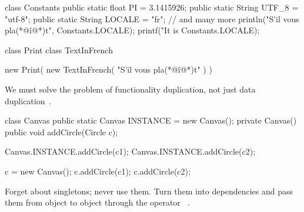 \documentclass{article}
\begin{document}

\begin{pptWide}{2}
{\small\begin{ffcode}
class Constants {
  public static float PI = 3.1415926;
  public static String UTF_8 = "utf-8";
  public static String LOCALE = "fr";
  // and many more
}
println("S'il vous pla(*@\^{i}@*)t",
  Constants.LOCALE);
printf("It is %
  Constants.LOCALE);
\end{ffcode}
}
\par\columnbreak\par
{\small\begin{ffcode}
class Print { }
class TextInFrench { }

new Print(
  new TextInFrench(
    "S'il vous pla(*@\^{i}@*)t"
  )
)
\end{ffcode}
}
\end{pptWide}
\par
We must solve the problem of functionality duplication, not just data duplication~\citep{bugayenko2015blog0706}.
\plush{}

\begin{pptWide}{2}
{\small\begin{ffcode}
class Canvas {
  public static Canvas INSTANCE =
    new Canvas();
  private Canvas() {}
  public void addCircle(Circle c);
}

Canvas.INSTANCE.addCircle(c1);
Canvas.INSTANCE.addCircle(c2);
\end{ffcode}
}
\par\columnbreak\par
{\small\begin{ffcode}
c = new Canvas();
c.addCircle(c1);
c.addCircle(c2);
\end{ffcode}
}
\end{pptWide}
\par
Forget about singletons; never use them. Turn them into dependencies and pass
them from object to object through the operator ~\citep{bugayenko2016blog0627}.
\plush{}

\end{document}
